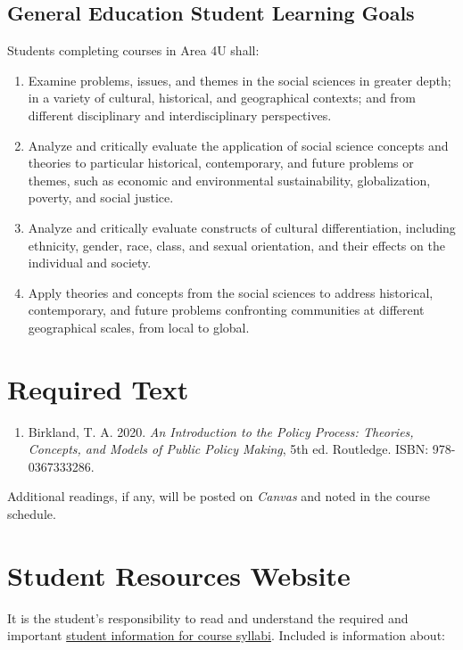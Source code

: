 \documentclass[12pt]{article}
\begin{document}
\subsection*{General Education Student Learning Goals}
Students completing courses in Area 4U shall:
\begin{enumerate}
    \item Examine problems, issues, and themes in the social sciences in greater depth; in a variety of cultural, historical, and geographical contexts; and from different disciplinary and interdisciplinary perspectives.
    \item Analyze and critically evaluate the application of social science concepts and theories to particular historical, contemporary, and future problems or themes, such as economic and environmental sustainability, globalization, poverty, and social justice.
    \item Analyze and critically evaluate constructs of cultural differentiation, including ethnicity, gender, race, class, and sexual orientation, and their effects on the individual and society.
    \item Apply theories and concepts from the social sciences to address historical, contemporary, and future problems confronting communities at different geographical scales, from local to global.
\end{enumerate}

\section*{Required Text}

\begin{enumerate}
    \item Birkland, T. A. 2020. \emph{An Introduction to the Policy Process: Theories, Concepts, and Models of Public Policy Making}, 5th ed. Routledge. ISBN: 978-0367333286.
\end{enumerate}

\noindent Additional readings, if any, will be posted on \emph{Canvas} and noted in the course schedule.

\section*{Student Resources Website}
It is the student's responsibility to read and understand the required and important \href{https://fdc.fullerton.edu/teaching/student-info-syllabi.html}{student information for course syllabi}. Included is information about:
\end{document}
